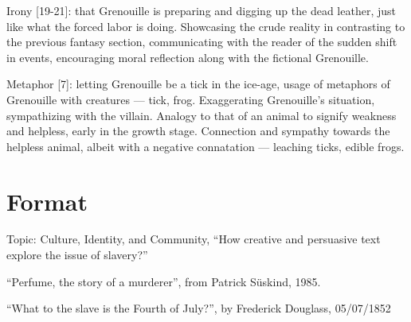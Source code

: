 \documentclass[a4paper,12pt]{article}
\begin{document}
Irony [19-21]: that Grenouille is preparing and digging up the dead leather, just like what the forced labor is doing. Showcasing the crude reality in contrasting to the previous fantasy section, communicating with the reader of the sudden shift in events, encouraging moral reflection along with the fictional Grenouille.

Metaphor [7]: letting Grenouille be a tick in the ice-age, usage of metaphors of Grenouille with creatures --- tick, frog. Exaggerating Grenouille's situation, sympathizing with the villain. Analogy to that of an animal to signify weakness and helpless, early in the growth stage. Connection and sympathy towards the helpless animal, albeit with a negative connatation --- leaching ticks, edible frogs.

\newpage
\section{Format}

Topic: Culture, Identity, and Community, ``How creative and persuasive text explore the issue of slavery?''

``Perfume, the story of a murderer'', from Patrick S\"uskind, 1985.

``What to the slave is the Fourth of July?'', by Frederick Douglass, 05/07/1852
\end{document}
